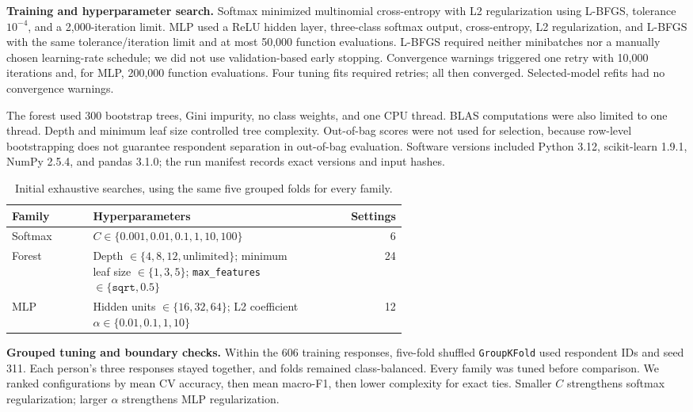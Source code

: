 \documentclass[10pt,letterpaper]{article}
\newcommand{\topic}[1]{\par\smallskip\textbf{#1}\quad}
\begin{document}
\topic{Training and hyperparameter search.}
Softmax minimized multinomial cross-entropy with L2 regularization using L-BFGS,
tolerance $10^{-4}$, and a 2,000-iteration limit. MLP used a ReLU hidden layer,
three-class softmax output, cross-entropy, L2 regularization, and L-BFGS with the
same tolerance/iteration limit and at most 50,000 function evaluations. L-BFGS
required neither minibatches nor a manually chosen learning-rate schedule; we did
not use validation-based early stopping. Convergence warnings triggered one retry
with 10,000 iterations and, for MLP, 200,000 function evaluations. Four tuning fits
required retries; all then converged. Selected-model refits had no convergence
warnings.

The forest used 300 bootstrap trees, Gini impurity, no class weights, and one CPU
thread. BLAS computations were also limited to one thread. Depth and minimum leaf
size controlled tree complexity. Out-of-bag scores were not used for selection,
because row-level bootstrapping does not guarantee respondent separation in
out-of-bag evaluation. Software versions included Python 3.12, scikit-learn 1.9.1,
NumPy 2.5.4, and pandas 3.1.0; the run manifest records exact versions and input hashes.

\begin{table}[ht]
\centering\small
\caption{Initial exhaustive searches, using the same five grouped folds for every family.}
\label{tab:search}
\begin{tabular}{lp{0.58\linewidth}r}
\toprule
Family & Hyperparameters & Settings\\
\midrule
Softmax & $C\in\{0.001,0.01,0.1,1,10,100\}$ & 6\\
Forest & Depth $\in\{4,8,12,\text{unlimited}\}$; minimum leaf size
$\in\{1,3,5\}$; \texttt{max\_features}$\in\{\texttt{sqrt},0.5\}$ & 24\\
MLP & Hidden units $\in\{16,32,64\}$;
L2 coefficient $\alpha\in\{0.01,0.1,1,10\}$ & 12\\
\bottomrule
\end{tabular}
\end{table}

\topic{Grouped tuning and boundary checks.}
Within the 606 training responses, five-fold shuffled \texttt{GroupKFold} used
respondent IDs and seed 311. Each person's three responses stayed together, and
folds remained class-balanced. Every family was tuned before comparison. We ranked
configurations by mean CV accuracy, then mean macro-F1, then lower complexity for
exact ties. Smaller $C$ strengthens softmax regularization; larger $\alpha$
strengthens MLP regularization.
\end{document}
